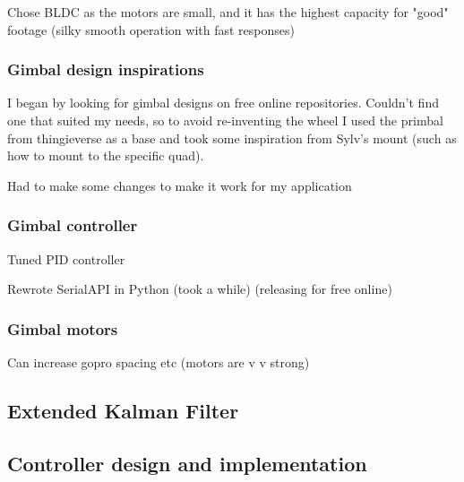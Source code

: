 Chose BLDC as the motors are small, and it has the highest capacity for "good" footage (silky smooth operation with fast responses)

\subsubsection{Gimbal design inspirations}
I began by looking for gimbal designs on free online repositories. Couldn't find one that suited my needs, so to avoid re-inventing the wheel I used the primbal from thingieverse as a base and took some inspiration from Sylv's mount (such as how to mount to the specific quad).

Had to make some changes to make it work for my application

\subsubsection{Gimbal controller}
Tuned PID controller

Rewrote SerialAPI in Python (took a while) (releasing for free online)

\subsubsection{Gimbal motors}
Can increase gopro spacing etc (motors are v v strong)


\subsection{Extended Kalman Filter}


\subsection{Controller design and implementation}
